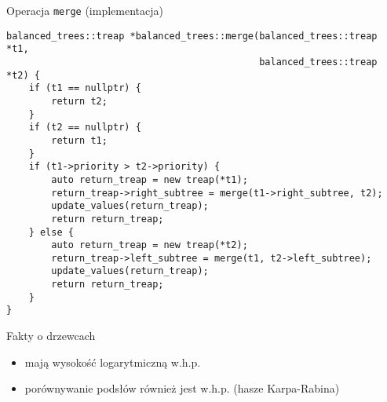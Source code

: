 \documentclass[polish]{beamer}
\begin{document}
\begin{frame}[fragile]{Operacja \texttt{merge} (implementacja)}
    \begin{lrbox}{\fifthbox}
        \begin{lstlisting}[linewidth=18cm]
balanced_trees::treap *balanced_trees::merge(balanced_trees::treap *t1,
                                             balanced_trees::treap *t2) {
    if (t1 == nullptr) {
        return t2;
    }
    if (t2 == nullptr) {
        return t1;
    }
    if (t1->priority > t2->priority) {
        auto return_treap = new treap(*t1);
        return_treap->right_subtree = merge(t1->right_subtree, t2);
        update_values(return_treap);
        return return_treap;
    } else {
        auto return_treap = new treap(*t2);
        return_treap->left_subtree = merge(t1, t2->left_subtree);
        update_values(return_treap);
        return return_treap;
    }
}
        \end{lstlisting}
    \end{lrbox}
    \begin{center}
        \vskip 2mm
        \scalebox{0.6}{\usebox{\fifthbox}}
    \end{center}
    \begin{alertblock}{Fakty o drzewcach} \pause
        \begin{itemize}
            \item mają wysokość logarytmiczną w.h.p. \pause
            \item porównywanie podsłów również jest w.h.p. (hasze Karpa-Rabina)
        \end{itemize}
    \end{alertblock}
\end{frame}
\end{document}
